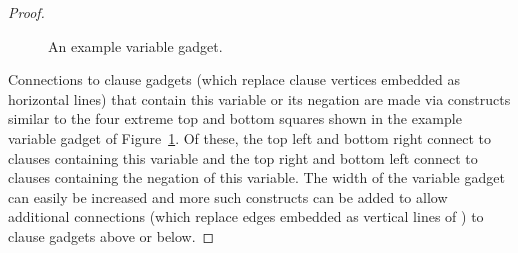 \begin{proof}
\begin{figure}[h]
\begin{center}


 \endpspicture
\end{center}
\caption{An example variable gadget.}
\label{fig:variablegadget}
\end{figure}
 

Connections to clause gadgets (which replace clause vertices embedded
as horizontal lines) that contain this variable or its negation are
made via constructs similar to the four extreme top and bottom squares
shown in the example variable gadget of
Figure~\ref{fig:variablegadget}.  Of these, the top left and bottom
right connect to clauses containing this variable and the top right
and bottom left connect to clauses containing the negation of this
variable.  The width of the variable gadget can easily be increased
and more such constructs can be added to allow additional connections
(which replace edges embedded as vertical lines of ) to
clause gadgets above or below.


\end{proof}
